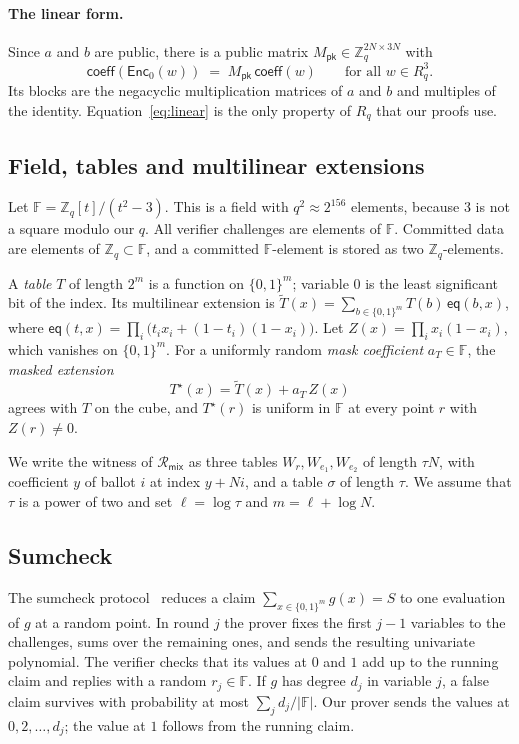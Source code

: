 \documentclass[sigconf,anonymous]{acmart}
\newcommand{\Zq}{\mathbb{Z}_q}
\newcommand{\Rq}{R_q}
\newcommand{\F}{\mathbb{F}}
\newcommand{\cube}[1]{\{0,1\}^{#1}}
\newcommand{\eq}{\mathsf{eq}}
\newcommand{\EncZ}{\mathsf{Enc}_0}
\newcommand{\coeff}{\mathsf{coeff}}
\newcommand{\Mpk}{M_{\mathsf{pk}}}
\newcommand{\Rmix}{\mathcal{R}_{\mathsf{mix}}}
\newcommand{\mle}[1]{\widetilde{#1}}
\newcommand{\msk}[1]{#1^{\star}}
\begin{document}
\paragraph{The linear form.}
Since $a$ and $b$ are public, there is a public matrix $\Mpk\in\Zq^{2N\times 3N}$ with
\begin{equation}\label{eq:linear}
  \coeff(\EncZ(w)) \;=\; \Mpk\,\coeff(w)\qquad\text{for all } w\in\Rq^3 .
\end{equation}
Its blocks are the negacyclic multiplication matrices of $a$ and $b$ and multiples of the identity.
Equation~\eqref{eq:linear} is the only property of $\Rq$ that our proofs use.

\subsection{Field, tables and multilinear extensions}

Let $\F=\Zq[t]/(t^2-3)$. This is a field with $q^2\approx 2^{156}$ elements, because $3$ is not a
square modulo our $q$. All verifier challenges are elements of $\F$. Committed data are elements of
$\Zq\subset\F$, and a committed $\F$-element is stored as two $\Zq$-elements.

A \emph{table} $T$ of length $2^m$ is a function on $\cube{m}$; variable $0$ is the least
significant bit of the index. Its multilinear extension is
$\mle{T}(x)=\sum_{b\in\cube{m}}T(b)\,\eq(b,x)$, where
$\eq(t,x)=\prod_i\bigl(t_ix_i+(1-t_i)(1-x_i)\bigr)$. Let $Z(x)=\prod_i x_i(1-x_i)$, which vanishes on
$\cube{m}$. For a uniformly random \emph{mask coefficient} $a_T\in\F$, the \emph{masked extension}
\[
  \msk{T}(x)=\mle{T}(x)+a_T\,Z(x)
\]
agrees with $T$ on the cube, and $\msk{T}(r)$ is uniform in $\F$ at every point $r$ with
$Z(r)\ne 0$.

We write the witness of $\Rmix$ as three tables $W_r,W_{e_1},W_{e_2}$ of length $\tau N$, with
coefficient $y$ of ballot $i$ at index $y+Ni$, and a table $\sigma$ of length $\tau$. We assume that
$\tau$ is a power of two and set $\ell=\log\tau$ and $m=\ell+\log N$.

\subsection{Sumcheck}

The sumcheck protocol~\cite{LFKN92} reduces a claim $\sum_{x\in\cube{m}}g(x)=S$ to one evaluation of
$g$ at a random point. In round $j$ the prover fixes the first $j-1$ variables to the challenges,
sums over the remaining ones, and sends the resulting univariate polynomial. The verifier checks
that its values at $0$ and $1$ add up to the running claim and replies with a random $r_j\in\F$.
If $g$ has degree $d_j$ in variable $j$, a false claim survives with probability at most
$\sum_j d_j/|\F|$. Our prover sends the values at $0,2,\dots,d_j$; the value at $1$ follows from the
running claim.
\end{document}
